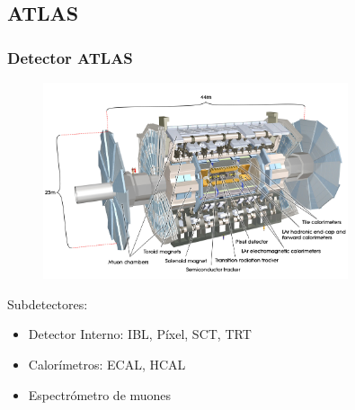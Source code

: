\documentclass[10pt, compress,spanish]{beamer}
\begin{document}
\subsection{ATLAS}

\begin{frame}[fragile]
\frametitle{Detector ATLAS}

\normalsize


\begin{figure}
\centering
\includegraphics[width=0.8\textwidth]{ATLAS-eps-converted-to.pdf}
\label{ATLAS}
\end{figure}


Subdetectores:
\begin{itemize}

  \item Detector Interno: IBL, Píxel, SCT, TRT

  \item Calorímetros: ECAL, HCAL

  \item Espectrómetro de muones

\end{itemize}


\end{frame}



\end{document}
